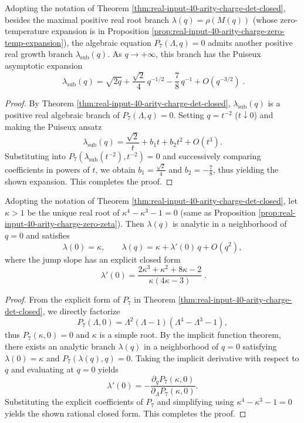\begin{proposition}\label{prop:real-input-40-arity-charge-subbranch-puiseux}
Adopting the notation of Theorem \ref{thm:real-input-40-arity-charge-det-closed}, besides the maximal positive real root branch \(\lambda(q)=\rho(M(q))\) (whose zero-temperature expansion is in Proposition \ref{prop:real-input-40-arity-charge-zero-temp-expansion}), the algebraic equation \(P_7(\Lambda,q)=0\) admits another positive real growth branch \(\lambda_{\mathrm{sub}}(q)\).
As \(q\to+\infty\), this branch has the Puiseux asymptotic expansion
\[
\boxed{\;
\lambda_{\mathrm{sub}}(q)=\sqrt{2q}+\frac{\sqrt2}{4}\,q^{-1/2}-\frac78\,q^{-1}+O(q^{-3/2})\; }.
\]
\end{proposition}
\begin{proof}
By Theorem \ref{thm:real-input-40-arity-charge-det-closed}, \(\lambda_{\mathrm{sub}}(q)\) is a positive real algebraic branch of \(P_7(\Lambda,q)=0\).
Setting \(q=t^{-2}\) (\(t\downarrow 0\)) and making the Puiseux ansatz
\[
\lambda_{\mathrm{sub}}(q)=\frac{\sqrt2}{t}+b_1t+b_2t^2+O(t^3).
\]
Substituting into \(P_7(\lambda_{\mathrm{sub}}(t^{-2}),t^{-2})=0\) and successively comparing coefficients in powers of \(t\), we obtain
\(
b_1=\frac{\sqrt2}{4}
\)
and
\(
b_2=-\frac78
\),
thus yielding the shown expansion. This completes the proof.
\end{proof}

\begin{proposition}\label{prop:real-input-40-arity-charge-derivative-q0}
Adopting the notation of Theorem \ref{thm:real-input-40-arity-charge-det-closed}, let \(\kappa>1\) be the unique real root of \(\kappa^4-\kappa^3-1=0\) (same as Proposition \ref{prop:real-input-40-arity-charge-zero-zeta}). Then \(\lambda(q)\) is analytic in a neighborhood of \(q=0\) and satisfies
\[
\lambda(0)=\kappa,\qquad
\lambda(q)=\kappa+\lambda'(0)\,q+O(q^2),
\]
where the jump slope has an explicit closed form
\[
\boxed{\;
\lambda'(0)=\frac{2\kappa^3+\kappa^2+8\kappa-2}{\kappa(4\kappa-3)}\; }.
\]
\end{proposition}
\begin{proof}
From the explicit form of \(P_7\) in Theorem \ref{thm:real-input-40-arity-charge-det-closed}, we directly factorize
\[
P_7(\Lambda,0)=\Lambda^2(\Lambda-1)(\Lambda^4-\Lambda^3-1),
\]
thus \(P_7(\kappa,0)=0\) and \(\kappa\) is a simple root. By the implicit function theorem, there exists an analytic branch \(\lambda(q)\) in a neighborhood of \(q=0\) satisfying \(\lambda(0)=\kappa\) and \(P_7(\lambda(q),q)=0\).
Taking the implicit derivative with respect to \(q\) and evaluating at \(q=0\) yields
\[
\lambda'(0)=-\frac{\partial_q P_7(\kappa,0)}{\partial_\Lambda P_7(\kappa,0)}.
\]
Substituting the explicit coefficients of \(P_7\) and simplifying using \(\kappa^4-\kappa^3-1=0\) yields the shown rational closed form. This completes the proof.
\end{proof}
